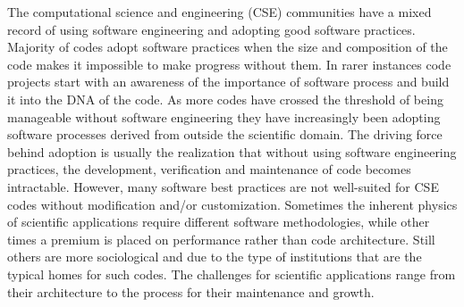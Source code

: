 The computational science and engineering (CSE) communities have a mixed record
of using software engineering and adopting good software
practices. Majority of codes adopt software practices when the size
and composition of the code makes it impossible to make progress
without them. In rarer instances code projects start with an awareness
of the importance of software process and build it into the DNA of the
code. As more codes have crossed the threshold of being manageable
without software engineering they have increasingly been 
adopting software processes derived from outside the scientific
domain. The driving force behind adoption is usually the realization
that without using software engineering practices, the development,
verification and maintenance of code becomes intractable. However,
many software best practices are not well-suited for CSE codes without
modification and/or customization. Sometimes the inherent physics of
scientific applications require different software methodologies,
while other times a premium is placed on performance rather than
code architecture.  Still others are more sociological and due to the
type of institutions that are the typical homes for such codes. The
challenges for scientific applications range from their architecture
to the process for their maintenance and growth. 
